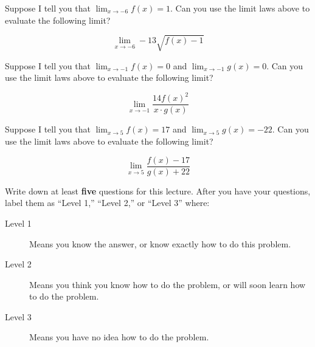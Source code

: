 \documentclass{ximera}
\begin{document}
\begin{question}
  Suppose I tell you that $\lim_{x\to -6} f(x) = 1$. Can you use the
  limit laws above to evaluate the following limit?

\[
\lim_{x\to -6} -13\sqrt{f(x)-1}
\]

    \begin{multipleChoice}
    \end{multipleChoice}  
\end{question}




\begin{question}
  Suppose I tell you that $\lim_{x\to -1} f(x) = 0$ and $\lim_{x\to
    -1}g(x) = 0$. Can you use the limit laws above to evaluate the
  following limit?

\[
\lim_{x\to -1} \frac{14 f(x)^2}{x\cdot g(x)}
\]

    \begin{multipleChoice}
    \end{multipleChoice}  
\end{question}



\begin{question}
  Suppose I tell you that $\lim_{x\to 5} f(x) = 17$ and $\lim_{x\to
    5}g(x) = -22$. Can you use the limit laws above to evaluate the
  following limit?

\[
\lim_{x\to 5} \frac{f(x)-17}{g(x)+22}
\]

    \begin{multipleChoice}
    \end{multipleChoice}  
\end{question}




\begin{question}
Write down at least \textbf{five} questions for this lecture. After
you have your questions, label them as ``Level 1,'' ``Level 2,'' or ``Level 3'' where:
\begin{description}
\item[Level 1] Means you know the answer, or know exactly how to do this problem.
\item[Level 2] Means you think you know how to do the problem, or will soon learn how to do the problem.
\item[Level 3] Means you have no idea how to do the problem. 
\end{description}
\begin{freeResponse}
\end{freeResponse}
\end{question}
\end{document}
